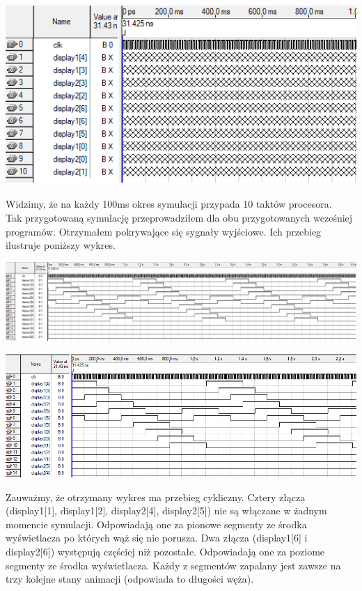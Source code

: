 \documentclass{article}
\begin{document}
        \begin{center}
            \includegraphics[width=18cm]{reports/img/fpga_sim_in_crop.png}\\
        \end{center}
        \FloatBarrier
        Widzimy, że na każdy 100ms okres symulacji przypada 10 taktów procesora.\\
        Tak przygotowaną symulację przeprowadziłem dla obu przygotowanych wcześniej programów. Otrzymałem pokrywające się sygnały wyjściowe. Ich przebieg ilustruje poniższy wykres.
        \begin{center}
            \includegraphics[width=18cm]{reports/img/fpga_sim_out.png}\\
        \end{center}
        \begin{center}
            \includegraphics[width=18cm]{reports/img/fpga_sim_out2.png}\\
        \end{center}
        Zauważmy, że otrzymany wykres ma przebieg cykliczny. Cztery złącza (display1[1], display1[2], display2[4], display2[5]) nie są włączane w żadnym momencie symulacji. Odpowiadają one za pionowe segmenty ze środka wyświetlacza po których wąż się nie porusza. Dwa złącza (display1[6] i display2[6]) występują częściej niż pozostałe. Odpowiadają one za poziome segmenty ze środka wyświetlacza. Każdy z segmentów zapalany jest zawsze na trzy kolejne stany animacji (odpowiada to długości węża). \\
        
\end{document}

